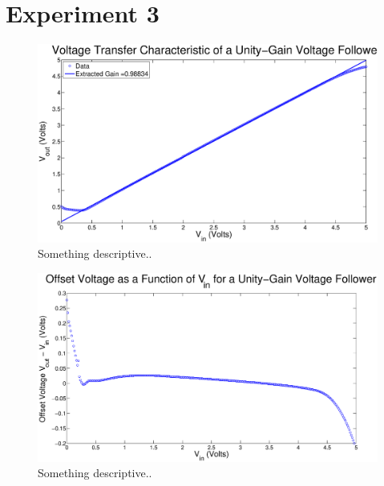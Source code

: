 \documentclass{article}
\begin{document}
\section*{Experiment 3} 

\begin{figure}[H]
\centering
\includegraphics[width=\linewidth]{../Figures/Exp3P1.eps}
\caption{Something descriptive..}
\label{fig:exp3p1}
\end{figure}

\begin{figure}[H]
\centering
\includegraphics[width=\linewidth]{../Figures/Exp3P2.eps}
\caption{Something descriptive..}
\label{fig:exp3p2}
\end{figure}
\end{document}
